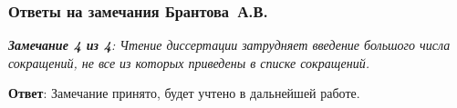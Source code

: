 \begin{frame}
	\frametitle{Ответы на замечания Брантова~А.В.}
	\small{\textit{\textbf{Замечание 4 из 4}: Чтение диссертации затрудняет введение большого числа сокращений, не все из которых приведены в списке сокращений.}}
	
	\hfill
	
	\textbf{Ответ}: Замечание принято, будет учтено в дальнейшей работе. 

	
\end{frame}